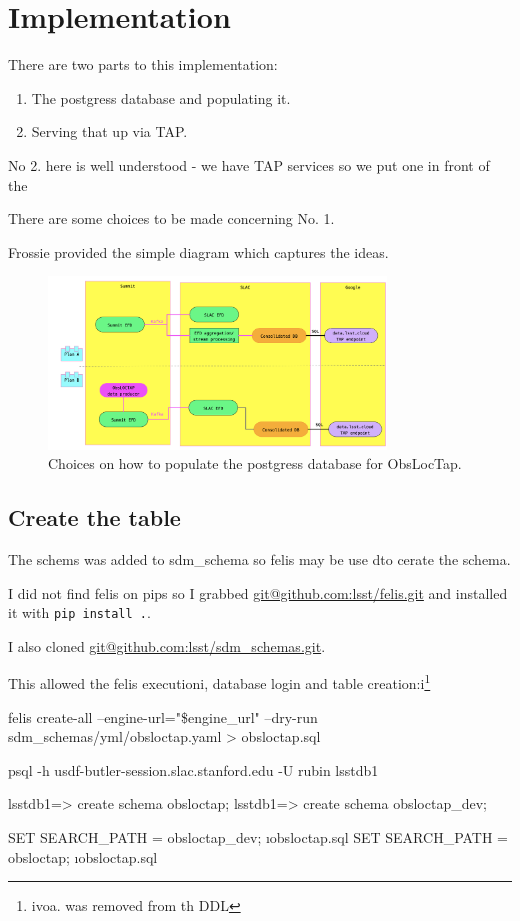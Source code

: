 \section{Implementation}

There are two parts to this implementation:

\begin{enumerate}
\item The postgress database and populating it.
\item Serving that up via TAP.
\end{enumerate}


No 2. here is well understood  - we have TAP services so we put one in front of the \DB

There are some choices to be made concerning No. 1.

Frossie provided the simple diagram  which captures the ideas.


\begin{figure}
\begin{centering}
\includegraphics[width=0.8\textwidth]{obsloctap}
	\caption{ Choices on how to populate the postgress database for ObsLocTap.
\label{fig:obsloctap}}
\end{centering}
\end{figure}


\subsection{Create the table}
The schems was added to {\code sdm\_schema} so felis may be use dto cerate the schema.

I did not find felis on pips so I grabbed \url{git@github.com:lsst/felis.git} and installed it with {\tt pip install .}.

I also cloned \url{git@github.com:lsst/sdm_schemas.git}.

This allowed the felis executioni, database login and table creation:i\footnote{ivoa. was removed  from th DDL} \\
\begin{code}
felis create-all --engine-url="\$engine\_url" --dry-run  sdm\_schemas/yml/obsloctap.yaml > obsloctap.sql

psql -h usdf-butler-session.slac.stanford.edu -U rubin lsstdb1

lsstdb1=> create schema obsloctap;
lsstdb1=> create schema obsloctap\_dev;

SET SEARCH_PATH = obsloctap_dev;
\i obsloctap.sql
SET SEARCH_PATH = obsloctap;
\i obsloctap.sql
\end{code}





